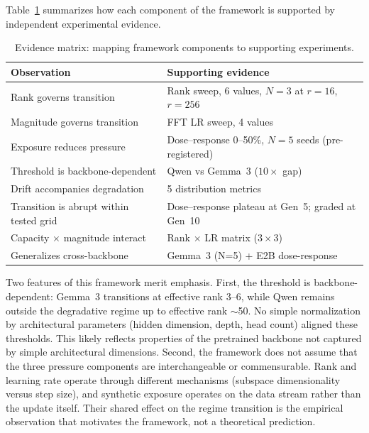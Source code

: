 \documentclass[a4paper,fleqn]{cas-dc}
\newif\ifshowchanges
\newcommand{\rev}[1]{\ifshowchanges{\color{blue}#1}\else{#1}\fi}
\renewcommand{\arraystretch}{1.8}
\begin{document}
Table~\ref{tab:evidence} summarizes how each component of the framework is
supported by independent experimental evidence.

\begin{table}[htbp]
\caption{Evidence matrix: mapping framework components to supporting
experiments.}\label{tab:evidence}
\footnotesize
\renewcommand{\arraystretch}{1.4}
\begin{tabularx}{\columnwidth}{@{}lX@{}}
\toprule
\textbf{Observation} & \textbf{Supporting evidence} \\
\midrule
Rank governs transition & Rank sweep, 6 values, $N{=}3$ at $r{=}16$, $r{=}256$ \\
\addlinespace
Magnitude governs transition & FFT LR sweep, 4 values \\
\addlinespace
\rev{Exposure reduces pressure} & \rev{Dose--response 0--50\%, $N{=}5$ seeds (pre-registered)} \\
\addlinespace
Threshold is backbone-dependent & Qwen vs Gemma~3 ($10{\times}$ gap) \\
\addlinespace
Drift accompanies degradation & 5 distribution metrics \\
\addlinespace
\rev{Transition is abrupt within tested grid} & \rev{Dose--response plateau at Gen~5; graded at Gen~10} \\
\addlinespace
Capacity $\times$ magnitude interact & Rank $\times$ LR matrix ($3{\times}3$) \\
\addlinespace
Generalizes cross-backbone & Gemma~3 (N=5) + E2B dose-response \\
\bottomrule
\end{tabularx}
\end{table}

Two features of this framework merit emphasis. First, the threshold is
backbone-dependent: Gemma~3 transitions at effective rank 3--6, while Qwen
remains outside the degradative regime up to effective rank ${\sim}$50. No simple normalization by architectural
parameters (hidden dimension, depth, head count) aligned these thresholds. This
likely reflects properties of the pretrained backbone not captured by simple
architectural dimensions. Second, the framework does not assume that the three
pressure components are interchangeable or commensurable. Rank and learning rate
operate through different mechanisms (subspace dimensionality versus step size),
and synthetic exposure operates on the data stream rather than the update
itself. Their shared effect on the regime transition is the empirical
observation that motivates the framework, not a theoretical prediction.
\end{document}
